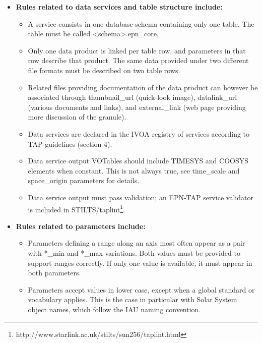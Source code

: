 \documentclass[11pt,a4paper]{ivoa}
\begin{document}
\begin{itemize}
\item \textbf{Rules related to data services and table structure include:}

\begin{itemize}
\item A service consists in one database schema containing only one table.
The table must be called <schema>.epn\_core.

\item Only one data product is linked per table row, and parameters
in that row describe that product. The same data provided under two
different file formats must be described on two table rows.

\item Related files providing documentation of the data product can
however be associated through thumbnail\_{url} (quick-look image),
datalink\_url (various documents and links), and external\_link (web
page providing more discussion of the granule).

\item Data services are declared in the IVOA registry of services
according to TAP guidelines (section 4).

\item Data service output VOTables should include TIMESYS and COOSYS
elements when constant. This is not always true, see time\_scale  and
space\_origin parameters for details.

\item Data service output must pass validation;
an EPN-TAP service validator is included in
STILTS/taplint\footnote{http://www.starlink.ac.uk/stilts/sun256/taplint.html}.
\end{itemize}


\item \textbf{Rules related to parameters include:}

\begin{itemize}
\item Parameters defining a range along an axis most often appear as a
pair with *\_min and *\_max variations.  Both values must be provided
to support ranges correctly. If only one value is available, it must
appear in both parameters.

\item Parameters accept values in lower case, except when a global
standard or vocabulary applies. This is the case in particular with
Solar System object names, which follow the IAU naming convention.


\end{itemize}
\end{itemize}
\end{document}

